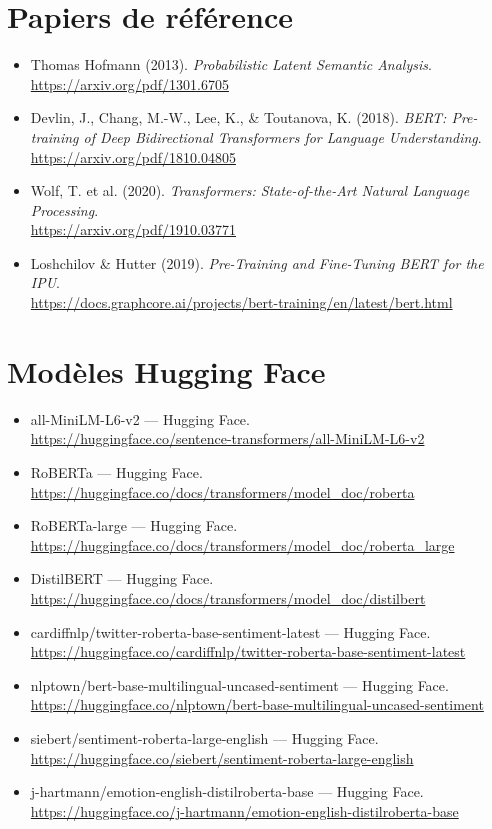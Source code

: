 \documentclass[12pt,a4paper]{report}
\begin{document}
\section*{Papiers de référence}

\begin{itemize}
  \item Thomas Hofmann (2013). \textit{Probabilistic Latent Semantic Analysis}. \\\url{https://arxiv.org/pdf/1301.6705}
  \item Devlin, J., Chang, M.-W., Lee, K., \& Toutanova, K. (2018). \textit{BERT: Pre-training of Deep Bidirectional Transformers for Language Understanding}. \\\url{https://arxiv.org/pdf/1810.04805}
  \item Wolf, T. et al. (2020). \textit{Transformers: State-of-the-Art Natural Language Processing}. \\\url{https://arxiv.org/pdf/1910.03771}
  \item Loshchilov \& Hutter (2019). \textit{Pre-Training and Fine-Tuning BERT for the IPU}. \\\url{https://docs.graphcore.ai/projects/bert-training/en/latest/bert.html}
\end{itemize}

\section*{Modèles Hugging Face}
\begin{itemize}
  \item all-MiniLM-L6-v2 — Hugging Face.\\
    \url{https://huggingface.co/sentence-transformers/all-MiniLM-L6-v2}
  \item RoBERTa — Hugging Face.\\
    \url{https://huggingface.co/docs/transformers/model_doc/roberta}
  \item RoBERTa-large — Hugging Face.\\
    \url{https://huggingface.co/docs/transformers/model_doc/roberta_large}
  \item DistilBERT — Hugging Face.\\
    \url{https://huggingface.co/docs/transformers/model_doc/distilbert}
  \item cardiffnlp/twitter-roberta-base-sentiment-latest — Hugging Face.\\
    \url{https://huggingface.co/cardiffnlp/twitter-roberta-base-sentiment-latest}
  \item nlptown/bert-base-multilingual-uncased-sentiment — Hugging Face.\\
    \url{https://huggingface.co/nlptown/bert-base-multilingual-uncased-sentiment}
  \item siebert/sentiment-roberta-large-english — Hugging Face.\\
    \url{https://huggingface.co/siebert/sentiment-roberta-large-english}
  \item j-hartmann/emotion-english-distilroberta-base — Hugging Face.\\
    \url{https://huggingface.co/j-hartmann/emotion-english-distilroberta-base}
\end{itemize}
\end{document}
